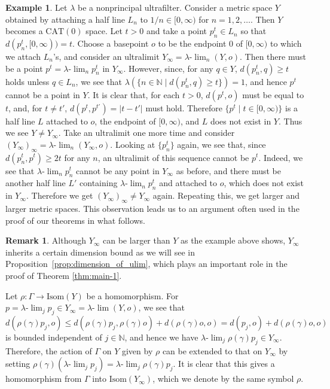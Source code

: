 \documentclass[12pt]{amsart}
\numberwithin{equation}{section}
\theoremstyle{plain}
\theoremstyle{definition}
\newtheorem{Remark}[Theorem]{Remark}
\newtheorem{Example}[Theorem]{Example}
\theoremstyle{remark}
\newcommand{\N}{{\mathbb N}}
\newcommand{\isom}[1]{\mathrm{Isom}({#1})}
\newcommand{\cat}[1]{\mathrm{CAT}(#1)}
\newcommand{\ulim}{\lambda{\text{-}}\!\lim}
\newcommand{\ray}[1]{[#1)}
\begin{document}
 \begin{Example}
 \label{example:larger_ultralmit}
  Let $\lambda$ be a nonprincipal ultrafilter. 
  Consider a metric space $Y$ obtained by attaching a half line $L_n$ to
  $1/n \in \ray{0,\infty}$ for $n=1,2,\dots$. 
  Then $Y$ becomes a $\cat{0}$ space. 
  Let $t>0$ and take a point $p_n^t \in L_n$ so that
  $d(p_n^t,\ray{0,\infty})=t$. 
  Choose a basepoint 
  $o$ to be the endpoint $0$ of $\ray{0,\infty}$ to which we 
  attach $L_n$'s, and consider an ultralimit 
  $Y_{\infty}=\ulim_n (Y,o)$. 
  Then there must be a point $p^t=\ulim_n p_n^t$ in $Y_{\infty}$. 
  However, since, for any $q \in Y$,  $d(p_n^t,q)\geq t$ holds unless 
  $q \in L_n$, we see that 
  $\lambda( \{n \in \N \mid d(p_n^t,q)\geq t\})=1$, and hence $p^t$
  cannot be a point in $Y$. 
  It is clear that, for each $t>0$, $d(p^t,o)$ must be equal to
  $t$,  and, for $t\not=t'$, $d(p^t,p^{t'})=|t-t'|$ must hold. 
  Therefore $\{p^t\mid t \in \ray{0,\infty}\}$ is a half line $L$
  attached to $o$, the endpoint of $\ray{0,\infty}$, and $L$
  does not exist in $Y$.  
  Thus we see $Y \not=Y_{\infty}$. 
  Take an ultralimit one more time and consider  
  $(Y_{\infty})_{\infty}=\ulim_n (Y_{\infty},o)$. 
  Looking at $\{p_n^t\}$ again, we see that, since 
  $d(p_n^t,p^t)\geq 2t$ for any $n$, an ultralimit of this sequence
  cannot be $p^t$. 
  Indeed, we see that $\ulim_n p_n^t$ cannot be any point in $Y_{\infty}$
  as before, and there must be another half line $L'$ containing 
  $\ulim_n p_n^t$ and attached to $o$, which does not
  exist in $Y_{\infty}$.  
  Therefore we get $(Y_{\infty})_{\infty}\not= Y_{\infty}$ again. 
  Repeating this, we get larger and larger metric spaces. 
  This observation leads us to an argument often used in the proof of
  our theorems in what follows. 
 \end{Example}

%
%
\begin{Remark}
 Although $Y_{\infty}$ can be larger than $Y$ as the example above
 shows,  $Y_{\infty}$ inherits a certain dimension bound as we will see
 in Proposition~\ref{prop:dimension_of_ulim}, 
 which plays an important role in the proof of Theorem
 \ref{thm:main-1}. 
\end{Remark}

%
%
 Let $\rho\colon \Gamma \rightarrow \isom{Y}$ be a homomorphism. 
 For $p=\ulim_j p_j \in Y_{\infty}=\ulim (Y,o)$, we see that 
\begin{equation*}
 d(\rho(\gamma)p_j,o) \leq d(\rho(\gamma)p_j, \rho(\gamma)o) + 
 d(\rho(\gamma)o,o) = d(p_j,o)+d(\rho(\gamma)o,o)
\end{equation*}
 is bounded independent of $j\in \N$,  and hence we have
 $\ulim_j \rho(\gamma)p_j \in Y_{\infty}$. 
 Therefore,  the action of $\Gamma$ on $Y$ given by 
 $\rho$ can be extended to that on $Y_{\infty}$ by setting 
 $\rho(\gamma)(\ulim_j p_j)=\ulim_j \rho(\gamma)p_j$. 
 It is clear that this gives a homomorphism from $\Gamma$ into
 $\isom{Y_{\infty}}$, which we denote by the same symbol $\rho$. 
\end{document}
